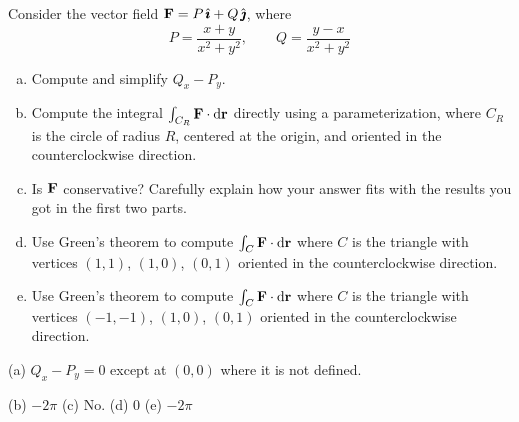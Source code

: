 \begin{question}[M317 2017A] %
Consider the vector field $\mathbf{F} = P\,\hat{\pmb{\imath}} + Q\,\hat{\pmb{\jmath}}$, where
\begin{equation*}
P=\frac{x+y}{x^2+y^2},\qquad
Q=\frac{y-x}{x^2+y^2}
\end{equation*}
\begin{enumerate}[(a)]
\item
Compute and simplify $Q_x - P_y$.

\item
Compute the integral $\int_{C_R} \mathbf{F} \cdot \mathrm{d}\mathbf{r}$ 
directly using a parameterization, where $C_R$ is the circle of radius $R$, 
centered at the origin, and oriented in the counterclockwise direction.

\item 
Is $\mathbf{F}$ conservative? Carefully explain how your answer fits with the 
results you got in the first two parts.

\item
Use Green's theorem to compute $\int_C \mathbf{F} \cdot \mathrm{d}\mathbf{r}$ where $C$ 
is the triangle with vertices $(1, 1)$, $(1, 0)$, $(0, 1)$ oriented in 
the counterclockwise direction.

\item
Use Green's theorem to compute $\int_C \mathbf{F} \cdot \mathrm{d}\mathbf{r}$ where $C$ 
is the triangle with vertices $(-1, -1)$, $(1, 0)$, $(0, 1)$ oriented in 
the counterclockwise direction.

\end{enumerate}
\end{question}


\begin{answer} 
(a) $Q_x-P_y=0$ except at $(0,0)$ where it is not defined.

(b) $-2\pi$\qquad
(c) No.\qquad
(d) $0$\qquad
(e) $-2\pi$
\end{answer}


